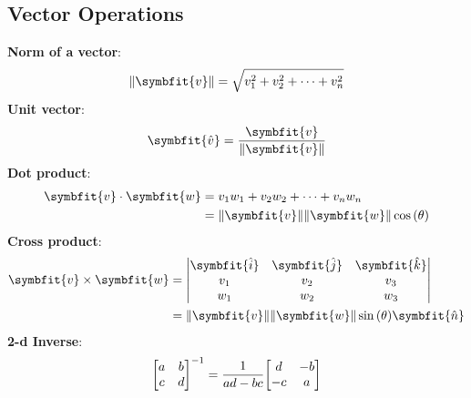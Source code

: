 \documentclass{article}
\begin{document}
\begin{multicols*}{2}
    \section*{Vector Operations}
    \textbf{Norm of a vector}:
    \begin{equation*}
        \norm{\symbfit{v}} = \sqrt{v_1^2 + v_2^2+\dots+v_n^2}
    \end{equation*}
    \textbf{Unit vector}:
    \begin{equation*}
        \symbfit{\hat{v}} = \frac{\symbfit{v}}{\norm{\symbfit{v}}}
    \end{equation*}
    \textbf{Dot product}:
    \begin{align*}
        \symbfit{v}\cdot\symbfit{w} & = v_1 w_1 + v_2 w_2 + \cdots + v_n w_n                            \\
                                    & = \norm{\symbfit{v}} \norm{\symbfit{w}} \cos{\left(\theta\right)}
    \end{align*}
    \textbf{Cross product}:
    \begin{align*}
        \symbfit{v}\times\symbfit{w} & =
        \mqty|
        \symbfit{\hat{i}}            & \symbfit{\hat{j}} & \symbfit{\hat{k}} \\
        v_1                          & v_2               & v_3               \\
        w_1                          & w_2               & w_3
        |                                                                    \\
                                     & =
        \norm{\symbfit{v}}\norm{\symbfit{w}}\sin{\left(\theta\right)}\symbfit{\hat{n}}
    \end{align*}
    \textbf{2-d Inverse}:
    \begin{equation*}
        \mqty[a & b \\ c & d]^{-1} = \frac{1}{ad - bc} \mqty[d & -b \\ -c & a]
    \end{equation*}

\end{multicols*}
\end{document}
